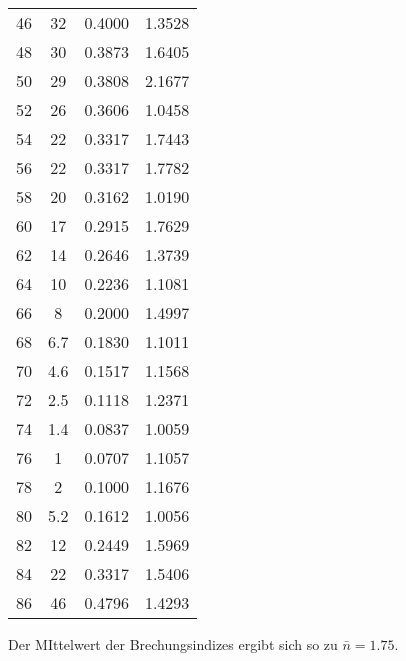 \begin{table}
\begin{tabular}{c c c c}
        \midrule
        46 & 32 & 0.4000 & 1.3528 \\
        48 & 30 & 0.3873 & 1.6405 \\
        50 & 29 & 0.3808 & 2.1677 \\
         52 & 26 & 0.3606 & 1.0458 \\
        54 & 22 & 0.3317 & 1.7443 \\
        56 & 22 & 0.3317 & 1.7782 \\
        58 & 20 & 0.3162 & 1.0190 \\
        60 & 17 & 0.2915 & 1.7629 \\
        62 & 14 & 0.2646 & 1.3739 \\
        64 & 10 & 0.2236 & 1.1081 \\
        66 & 8 & 0.2000 & 1.4997 \\
       68 & 6.7 & 0.1830 & 1.1011 \\
       70 & 4.6 & 0.1517 & 1.1568 \\
       72 & 2.5 & 0.1118 & 1.2371 \\
       74 & 1.4 & 0.0837 & 1.0059 \\
        76 & 1 & 0.0707 & 1.1057 \\
        78 & 2 & 0.1000 & 1.1676 \\
       80 & 5.2 & 0.1612 & 1.0056 \\
        82 & 12 & 0.2449 & 1.5969 \\
        84 & 22 & 0.3317 & 1.5406 \\
        86 & 46 & 0.4796 & 1.4293\\
        \bottomrule
    \end{tabular}
    \label{tab:Pol0}
\end{table}
Der MIttelwert der Brechungsindizes ergibt sich so zu $\bar{n}= 1.75$.